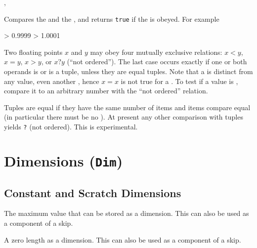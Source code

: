 \documentclass[oneside]{book}
\begin{document}
\begin{function}{\FpCompare,\FpCompareTF}
\begin{syntax}
   
     
\end{syntax}
Compares the  and the , and returns
\texttt{true} if the  is obeyed. For example
\begin{demohigh}
 > {0.9999} {} {}
 > {1.0001} {} {}
\end{demohigh}
Two floating points
$x$ and $y$ may obey four mutually exclusive relations:
$x<y$, $x=y$, $x>y$, or $x?y$ (\enquote{not ordered}).  The last
case occurs exactly if one or both operands is \nan{} or is a tuple,
unless they are equal tuples.  Note that a \nan{} is distinct from
any value, even another \nan{}, hence $x=x$ is not true for
a \nan{}.  To test if a value is \nan{}, compare it to an arbitrary
number with the \enquote{not ordered} relation.\par
Tuples are equal if they have the same number of items and items
compare equal (in particular there must be no \nan{}).
At present any other comparison with tuples yields \verb|?| (not ordered).
This is experimental.
\end{function}

\chapter{Dimensions (\texttt{Dim})}

\section{Constant and Scratch Dimensions}

\begin{variable}{\cMaxDim}
The maximum value that can be stored as a dimension.  This can also
be used as a component of a skip.
\end{variable}

\begin{variable}{\cZeroDim}
A zero length as a dimension.  This can also be used as a component
of a skip.
\end{variable}
\end{document}
